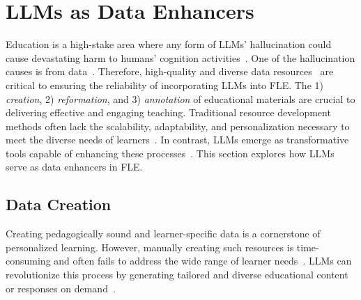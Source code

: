 \section{LLMs as Data Enhancers}\label{sec:enhancer}
Education is a high-stake area where any form of LLMs' hallucination could cause devastating harm to humans' cognition activities~\cite{ho2024mitigating}. One of the hallucination causes is from data~\cite{huang2023survey}. Therefore, high-quality and diverse data resources~\cite{long-etal-2024-llms} are critical to ensuring the reliability of incorporating LLMs into FLE. The 1) \textit{creation}, 2) \textit{reformation}, and 3) \textit{annotation} of educational materials are crucial to delivering effective and engaging teaching. Traditional resource development methods often lack the scalability, adaptability, and personalization necessary to meet the diverse needs of learners~\cite{feng-etal-2021-survey,shorten2021text}. In contrast, LLMs emerge as transformative tools capable of enhancing these processes~\cite{wang2024survey,liu2024best}. This section explores how LLMs serve as data enhancers in FLE.


\subsection{Data Creation}
Creating pedagogically sound and learner-specific data is a cornerstone of personalized learning. However, manually creating such resources is time-consuming and often fails to address the wide range of learner needs~\cite{cochran2022improving}. LLMs can revolutionize this process by generating tailored and diverse educational content or responses on demand~\cite{zha2023data,cochran2023improving}.


